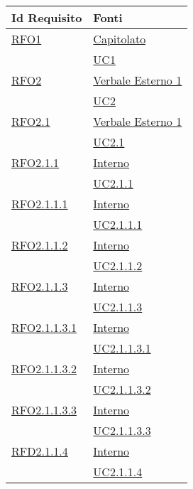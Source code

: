 \normalsize
\begin{longtable}{|>{\centering}m{5cm}|m{5cm}<{\centering}|}
\hline
\textbf{Id Requisito} & \textbf{Fonti}\\
\hline
\endhead
\hyperlink{RFO1}{RFO1} & \hyperlink{Capitolato}{Capitolato}\\
& \hyperref[UC1]{UC1}\\ \hline

\hyperlink{RFO2}{RFO2} & \hyperlink{Verbale Esterno 1}{Verbale Esterno 1}\\
& \hyperref[UC2]{UC2}\\ \hline

\hyperlink{RFO2.1}{RFO2.1} & \hyperlink{Verbale Esterno 1}{Verbale Esterno 1}\\
& \hyperref[UC2.1]{UC2.1}\\ \hline

\hyperlink{RFO2.1.1}{RFO2.1.1} & \hyperlink{Interno}{Interno}\\
& \hyperref[UC2.1.1]{UC2.1.1}\\ \hline

\hyperlink{RFO2.1.1.1}{RFO2.1.1.1} & \hyperlink{Interno}{Interno}\\
& \hyperref[UC2.1.1.1]{UC2.1.1.1}\\ \hline

\hyperlink{RFO2.1.1.2}{RFO2.1.1.2} & \hyperlink{Interno}{Interno}\\
& \hyperref[UC2.1.1.2]{UC2.1.1.2}\\ \hline

\hyperlink{RFO2.1.1.3}{RFO2.1.1.3} & \hyperlink{Interno}{Interno}\\
& \hyperref[UC2.1.1.3]{UC2.1.1.3}\\ \hline

\hyperlink{RFO2.1.1.3.1}{RFO2.1.1.3.1} & \hyperlink{Interno}{Interno}\\
& \hyperref[UC2.1.1.3.1]{UC2.1.1.3.1}\\ \hline

\hyperlink{RFO2.1.1.3.2}{RFO2.1.1.3.2} & \hyperlink{Interno}{Interno}\\
& \hyperref[UC2.1.1.3.2]{UC2.1.1.3.2}\\ \hline

\hyperlink{RFO2.1.1.3.3}{RFO2.1.1.3.3} & \hyperlink{Interno}{Interno}\\
& \hyperref[UC2.1.1.3.3]{UC2.1.1.3.3}\\ \hline

\hyperlink{RFD2.1.1.4}{RFD2.1.1.4} & \hyperlink{Interno}{Interno}\\
& \hyperref[UC2.1.1.4]{UC2.1.1.4}\\ \hline


\end{longtable}
